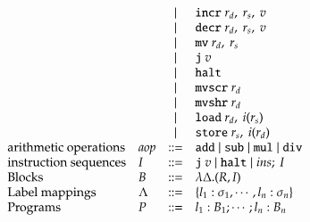 \begin{equation*}
\begin{array}{llcl}
                                &       & \mid& \texttt{incr}\ r_d,\ r_s,\ v \\
                                &       & \mid& \texttt{decr}\ r_d,\ r_s,\ v \\
                                &       & \mid& \texttt{mv}\ r_d,\ r_s \\
                                &       & \mid& \texttt{j}\ v\\
                                &       & \mid& \texttt{halt} \\
                                &       & \mid& \texttt{mvscr}\ r_d \\
                                &       & \mid& \texttt{mvshr}\ r_d \\
                                &       & \mid& \texttt{load}\ r_d,\ i(r_s) \\
                                &       & \mid& \texttt{store}\ r_s,\ i(r_d) \\
        \text{arithmetic operations}    & aop   & ::= & \texttt{add} \mid \texttt{sub} 
                                            \mid \texttt{mul} \mid \texttt{div} \\
        \text{instruction sequences}    & I     & ::= & 
                                                \texttt{j}\ v
                                                \mid 
                                                \texttt{halt}
                                                \mid 
                                                ins;\ I
                                                \\
        \text{Blocks}           & B & ::= & \lambda \Delta.(R, I) \\
        \text{Label mappings}   & \Lambda & ::= &
                    \{l_1 : \sigma_1, \cdots, l_n : \sigma_n\} \\
        \text{Programs}         & P & ::= & l_1: B_1; \cdots ; l_n : B_n \\
    \end{array}
\end{equation*}

